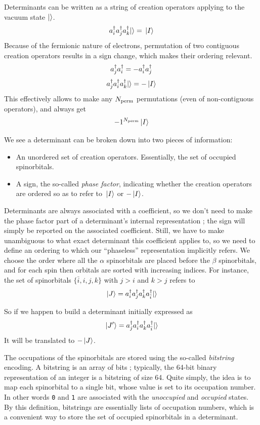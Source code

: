 \documentclass[./thesis.tex]{subfiles}
\begin{document}
Determinants can be written as a string of creation operators applying to the vacuum state ${\ket{}}$.
$$a^\dagger_{i} a^\dagger_{j} a^\dagger_{k} {\ket{}} = {\ket*{I}}$$
Because of the fermionic nature of electrons, permutation of two contiguous creation operators results in a sign change, which makes their ordering relevant.
$$a^\dagger_{j} a^\dagger_{i} = -a^\dagger_{i} a^\dagger_{j}$$
$$a^\dagger_{j} a^\dagger_{i} a^\dagger_{k} {\ket{}} = -{\ket*{I}}$$
This effectively allows to make any ${N_\text{perm}}$ permutations (even of non-contiguous operators), and always get
$$-1^{{N_\text{perm}}} {\ket*{I}}$$


We see a determinant can be broken down into two pieces of information:
\begin{itemize}
\item
An unordered set of creation operators. Essentially, the set of occupied spinorbitals.
\item
A sign, the so-called \emph{phase factor}, indicating whether the creation operators are ordered so as to refer to ${\ket*{I}}$ or $-{\ket*{I}}$.
\end{itemize}

Determinants are always associated with a coefficient, so we don't need to make the phase factor part of a determinant's internal representation ; the sign will simply be reported on the associated coefficient. Still, we have to make unambiguous to what exact determinant this coefficient applies to, so we need to define an ordering to which our ``phaseless'' representation implicitly refers. We choose the order where all the $\alpha$ spinorbitals are placed before the $\beta$ spinorbitals, and for each spin then orbitals are sorted with increasing indices.
For instance, the set of spinorbitals $\{\bar i, i,j,k \}$ with $j>i$ and $k>j$ refers to
$${\ket*{J}} = a^\dagger_{i} a^\dagger_{j} a^\dagger_{k} a^\dagger_{\bar i} {\ket{}} $$

So if we happen to build a determinant initially expressed as
$${\ket*{J'}} = a^\dagger_{j} a^\dagger_{i} a^\dagger_{k} a^\dagger_{\bar i} {\ket{}} $$
It will be translated to $-{\ket*{J}}$.


The occupations of the spinorbitals are stored using the so-called \emph{bitstring} encoding. A bitstring is an array of bits ; typically, the 64-bit binary representation of an integer is a bitstring of size 64.
Quite simply, the idea is to map each spinorbital to a single bit, whose value is set to its occupation number. In other words \texttt{0} and \texttt{1} are associated with the \emph{unoccupied} and \emph{occupied} states.
By this definition, bitstrings are essentially lists of occupation numbers, which is a convenient way to
store the set of occupied spinorbitals in a determinant.
\end{document}
